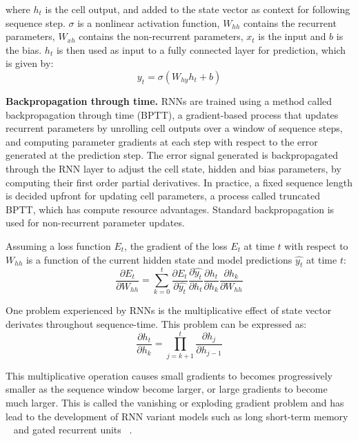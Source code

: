 \noindent where $h_t$ is the cell output, and added to the state vector as context for following sequence step. $\sigma$ is a nonlinear activation function, $W_{hh}$ contains the recurrent parameters, $W_{xh}$ contains the non-recurrent parameters, $x_t$ is the input and $b$ is the bias. $h_t$ is then used as input to a fully connected layer for prediction, which is given by:
\begin{equation}
	y_t = \sigma(W_{hy}h_{t} + b)
\end{equation}

\noindent \textbf{Backpropagation through time.} RNNs are trained using a method called backpropagation through time (BPTT),  a gradient-based process that updates recurrent parameters by unrolling cell outputs over a window of sequence steps, and computing parameter gradients at each step with respect to the error generated at the prediction step. The error signal generated is backpropagated through the RNN layer to adjust the cell state, hidden and bias parameters, by computing their first order partial derivatives. In practice, a fixed sequence length is decided upfront for updating cell parameters, a process called truncated BPTT, which has compute resource advantages. Standard backpropagation is used for non-recurrent parameter updates. \par

\noindent Assuming a loss function $ E_t $, the gradient of the loss $E_t$ at time $t$ with respect to $W_{hh}$ is a function of the current hidden state and model predictions $\hat{y_t}$ at time $t$:  
\begin{equation}
	\frac{\partial E_t} {\partial W_{hh}} = \sum_{k=0}^{t}\frac{\partial E_t} {\partial \hat{y_t}}\frac{\partial \hat{y_t}} {\partial h_t}\frac{\partial h_t} {\partial h_k}\frac{\partial h_k} {\partial W_{hh}}
\end{equation}

\noindent One problem experienced by RNNs is the multiplicative effect of state vector derivates throughout sequence-time. This problem can be expressed as:
\begin{equation}
	\frac{\partial h_t} {\partial h_k} = \prod_{j=k+1}^t\frac{\partial h_j} {\partial h_{j-1}}
\end{equation}

\noindent This multiplicative operation causes small gradients to becomes progressively smaller as the sequence window become larger, or large gradients to become much larger. This is called the vanishing or exploding gradient problem and has lead to the development of RNN variant models such as long short-term memory \unskip ~\citep{hochreiter1997long} and gated recurrent units \unskip ~\citep{cho2014learning}.


